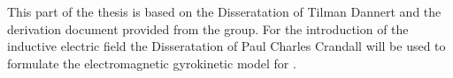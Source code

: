 \bigskip
This part of the thesis is based on the Disseratation of Tilman Dannert\cite{Dannert_PHD} and the derivation document provided from the \gkw group\cite{GKWDerivation}. For the introduction of the inductive electric field the Disseratation of Paul Charles Crandall\cite{Crandall_PHD} will be used to formulate the electromagnetic gyrokinetic model for \gkw.

\newpage